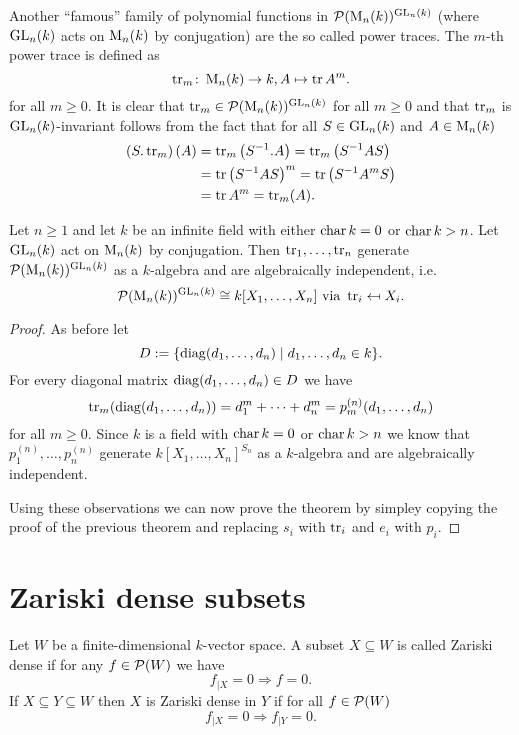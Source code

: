 Another ``famous'' family of polynomial functions in $\mathcal{P}(\operatorname{M}_n(k))^{\operatorname{GL}_n(k)}$ (where $\operatorname{GL}_n(k)$ acts on $\operatorname{M}_n(k)$ by conjugation) are the so called power traces. The $m$-th power trace is defined as
\[
 \operatorname{tr}_m \colon \operatorname{M}_n(k) \to k, A \mapsto \operatorname{tr} A^m.
\]
for all $m \geq 0$. It is clear that $\operatorname{tr}_m \in \mathcal{P}(\operatorname{M}_n(k))^{\operatorname{GL}_n(k)}$ for all $m \geq 0$ and that $\operatorname{tr}_m$ is $\operatorname{GL}_n(k)$-invariant follows from the fact that for all $S \in \operatorname{GL}_n(k)$ and $A \in \operatorname{M}_n(k)$
\begin{align*}
 \left(S.\operatorname{tr}_m\right)(A)
 &= \operatorname{tr}_m\left(S^{-1}.A\right)
 = \operatorname{tr}_m\left(S^{-1} A S\right) \\
 &= \operatorname{tr} \left(S^{-1} A S\right)^m
 = \operatorname{tr} \left(S^{-1} A^m S\right) \\
 &= \operatorname{tr} A^m
 = \operatorname{tr}_m(A).
\end{align*}


\begin{thrm}
 Let $n \geq 1$ and let $k$ be an infinite field with either $\operatorname{char} k = 0$ or $\operatorname{char} k > n$. Let $\operatorname{GL}_n(k)$ act on $\operatorname{M}_n(k)$ by conjugation. Then $\operatorname{tr}_1, \dotsc, \operatorname{tr}_n$ generate $\mathcal{P}(\operatorname{M}_n(k))^{\operatorname{GL}_n(k)}$ as a $k$-algebra and are algebraically independent, i.e.
 \[
  \mathcal{P}(\operatorname{M}_n(k))^{\operatorname{GL}_n(k)} \cong k[X_1, \dotsc, X_n] \text{ via } \operatorname{tr}_i \mapsfrom X_i.
 \]
\end{thrm}
\begin{proof}
 As before let 
 \[
  D := \{\operatorname{diag}(d_1, \dotsc, d_n) \mid d_1, \dotsc, d_n \in k\}.
 \]
 For every diagonal matrix $\operatorname{diag}(d_1, \dotsc, d_n) \in D$ we have
 \[
  \operatorname{tr}_m(\operatorname{diag}(d_1, \dotsc, d_n)) = d_1^m + \dotsb + d_n^m = p^{(n)}_m(d_1, \dotsc, d_n)
 \]
 for all $m \geq 0$. Since $k$ is a field with $\operatorname{char} k = 0$ or $\operatorname{char} k > n$ we know that $p^{(n)}_1, \dotsc, p^{(n)}_n$ generate $k[X_1, \dotsc, X_n]^{S_n}$ as a $k$-algebra and are algebraically independent.
 
 Using these observations we can now prove the theorem by simpley copying the proof of the previous theorem and replacing $s_i$ with $\operatorname{tr}_i$ and $e_i$ with $p_i$.
\end{proof}





\section{Zariski dense subsets}


\begin{defi}
 Let $W$ be a finite-dimensional $k$-vector space. A subset $X \subseteq W$ is called Zariski dense if for any $f \in \mathcal{P}(W)$ we have
 \[
  f_{|X} = 0 \Rightarrow f = 0.
 \]
 If $X \subseteq Y \subseteq W$ then $X$ is Zariski dense in $Y$ if for all $f \in \mathcal{P}(W)$
 \[
  f_{|X} = 0 \Rightarrow f_{|Y} = 0.
 \]
\end{defi}


